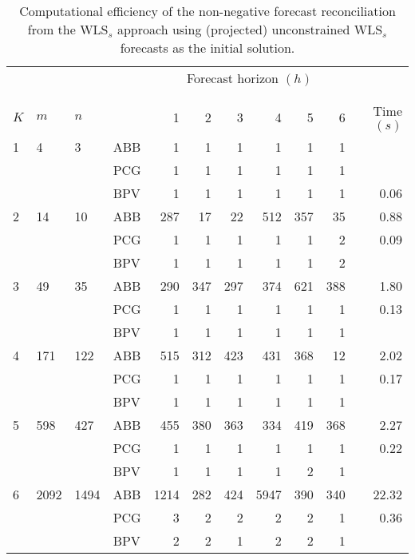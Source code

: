 \documentclass[11pt]{article}
\newcommand{\0}{\phantom{0}}
\begin{document}
\begin{table}[ht]
	\small
	\tabcolsep=0.20cm
	\captionsetup{belowskip=0pt, aboveskip=4pt}
	\caption{Computational efficiency of the non-negative forecast reconciliation from the WLS$_{s}$ approach using (projected) unconstrained WLS$_{s}$ forecasts as the initial solution.}
	\label{tbl:perfnnwlsp}
	\centering
	\begin{threeparttable}
		\begin{tabular}{llllrrrrrrr}
			\toprule
			& & & & \multicolumn{6}{c}{Forecast horizon $(h)$}\\[-0.4cm]\\\cline{5-10}\\[-0.3cm]
			$K$ & $m$ & $n$ & & 1 & 2 & 3 & 4 & 5 & 6 & Time $(s)$\\ 
			\midrule
			1 & 4 & 3 & ABB & 1 & 1 & 1 & 1 & 1 & 1 & \pmb{$0.03$} \\
			& & & PCG & 1 & 1 & 1 & 1 & 1 & 1 & \pmb{$0.03$} \\
			& & & BPV & 1 & 1 & 1 & 1 & 1 & 1 & 0.06 \\
			\midrule
			2 & 14 & 10 & ABB & 287 & 17 & 22 & 512 & 357 & 35 & 0.88 \\			
			& & & PCG & 1 & 1 & 1 & 1 & 1 & 2 & 0.09 \\
			& & & BPV & 1 & 1 & 1 & 1 & 1 & 2 & \pmb{$0.08$} \\
			\midrule
			3 & 49 & 35 & ABB & 290 & 347 & 297 & 374 & 621 & 388 & 1.80 \\
			& & & PCG & 1 & 1 & 1 & 1 & 1 & 1 & 0.13 \\	
			& & & BPV & 1 & 1 & 1 & 1 & 1 & 1 & \pmb{$0.07$} \\
			\midrule		
			4 & 171 & 122 & ABB & 515 & 312 & 423 & 431 & 368 & 12 & 2.02 \\
			& & & PCG & 1 & 1 & 1 & 1 & 1 & 1 & 0.17 \\
			& & & BPV & 1 & 1 & 1 & 1 & 1 & 1 & \pmb{$0.09$} \\
			\midrule
			5 & 598 & 427 & ABB & 455 & 380 & 363 & 334 & 419 & 368 & 2.27 \\
			& & & PCG & 1 & 1 & 1 & 1 & 1 & 1 & 0.22 \\	
			& & & BPV & 1 & 1 & 1 & 1 & 2 & 1 & \pmb{$0.12$} \\ 
			\midrule		
			6 & 2092 & 1494 & ABB & 1214 & 282 & 424 & 5947 & 390 & 340 & 22.32 \\
			& & & PCG & 3 & 2 & 2 & 2 & 2 & 1 & 0.36 \\
			& & & BPV & 2 & 2 & 1 & 2 & 2 & 1 & \pmb{$0.17$} \\

\end{tabular}
\end{threeparttable}
\end{table}
\end{document}
